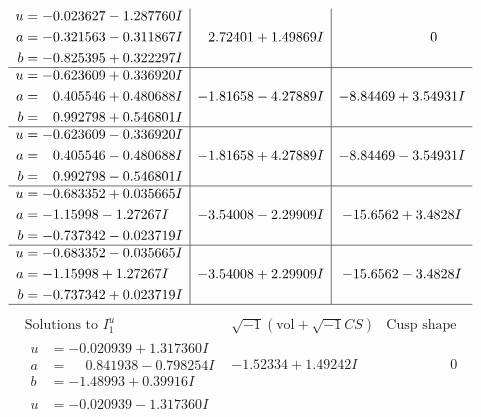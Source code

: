 \documentclass[1p]{elsarticle_modified}
\theoremstyle{definition}
\newcommand{\I}{\sqrt{-1}}
\begin{document}
$$\begin{array}{c|c|c}
\begin{aligned}
u &= -0.023627 - 1.287760 I \\
a &= -0.321563 - 0.311867 I \\
b &= -0.825395 + 0.322297 I\end{aligned}
 & \phantom{-}2.72401 + 1.49869 I & \phantom{-0.000000 } 0 \\ \hline\begin{aligned}
u &= -0.623609 + 0.336920 I \\
a &= \phantom{-}0.405546 + 0.480688 I \\
b &= \phantom{-}0.992798 + 0.546801 I\end{aligned}
 & -1.81658 - 4.27889 I & -8.84469 + 3.54931 I \\ \hline\begin{aligned}
u &= -0.623609 - 0.336920 I \\
a &= \phantom{-}0.405546 - 0.480688 I \\
b &= \phantom{-}0.992798 - 0.546801 I\end{aligned}
 & -1.81658 + 4.27889 I & -8.84469 - 3.54931 I \\ \hline\begin{aligned}
u &= -0.683352 + 0.035665 I \\
a &= -1.15998 - 1.27267 I \\
b &= -0.737342 - 0.023719 I\end{aligned}
 & -3.54008 - 2.29909 I & -15.6562 + 3.4828 I \\ \hline\begin{aligned}
u &= -0.683352 - 0.035665 I \\
a &= -1.15998 + 1.27267 I \\
b &= -0.737342 + 0.023719 I\end{aligned}
 & -3.54008 + 2.29909 I & -15.6562 - 3.4828 I\\
 \hline 
 \end{array}$$\newpage$$\begin{array}{c|c|c}  
\text{Solutions to }I^u_{1}& \I (\text{vol} + \sqrt{-1}CS) & \text{Cusp shape}\\
 \hline 
\begin{aligned}
u &= -0.020939 + 1.317360 I \\
a &= \phantom{-}0.841938 - 0.798254 I \\
b &= -1.48993 + 0.39916 I\end{aligned}
 & -1.52334 + 1.49242 I & \phantom{-0.000000 } 0 \\ \hline\begin{aligned}
u &= -0.020939 - 1.317360 I \\

\end{aligned}
\end{array}$$
\end{document}

